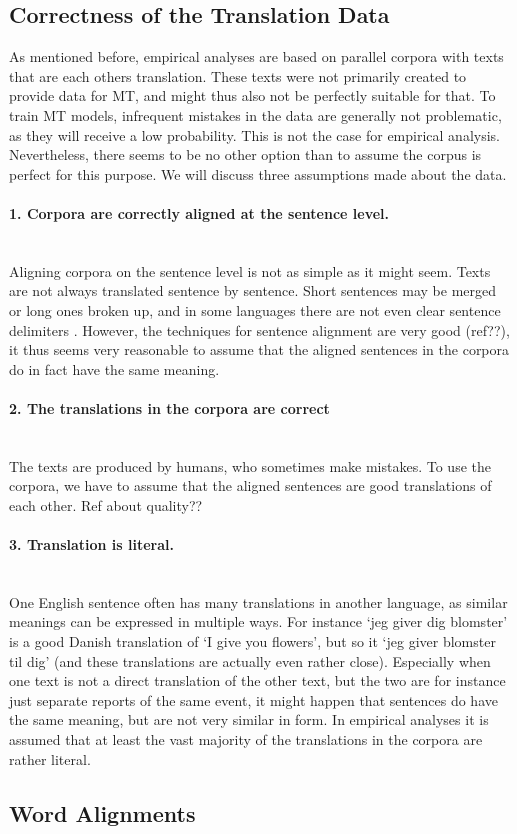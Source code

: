 \documentclass{report}
\newcommand{\myparagraph}[1]{\paragraph{#1}\mbox{}\\}
\theoremstyle{definition}
\theoremstyle{plain}
\begin{document}
\subsection{Correctness of the Translation Data}

As mentioned before, empirical analyses are based on parallel corpora with texts that are each others translation. These texts were not primarily created to provide data for MT, and might thus also not be perfectly suitable for that. To train MT models, infrequent mistakes in the data are generally not problematic, as they will receive a low probability. This is not the case for empirical analysis. Nevertheless, there seems to be no other option than to assume the corpus is perfect for this purpose. We will discuss three assumptions made about the data.

\myparagraph{1. Corpora are correctly aligned at the sentence level.}
Aligning corpora on the sentence level is not as simple as it might seem. Texts are not always translated sentence by sentence. Short sentences may be merged or long ones broken up, and in some languages there are not even clear sentence delimiters \citep[p.55]{koehn2008statistical}. However, the techniques for sentence alignment are very good (ref??), it thus seems very reasonable to assume that the aligned sentences in the corpora do in fact have the same meaning.

\myparagraph{2. The translations in the corpora are correct}
The texts are produced by humans, who sometimes make mistakes. To use the corpora, we have to assume that the aligned sentences are good translations of each other. Ref about quality??

\myparagraph{3. Translation is literal.}
 One English sentence often has many translations in another language, as similar meanings can be expressed in multiple ways. For instance `jeg giver dig blomster' is a good Danish translation of `I give you flowers', but so it `jeg giver blomster til dig' (and these translations are actually even rather close). Especially when one text is not a direct translation of the other text, but the two are for instance just separate reports of the same event, it might happen that sentences do have the same meaning, but are not very similar in form. In empirical analyses it is assumed that at least the vast majority of the translations in the corpora are rather literal.

\subsection{Word Alignments}
\end{document}
